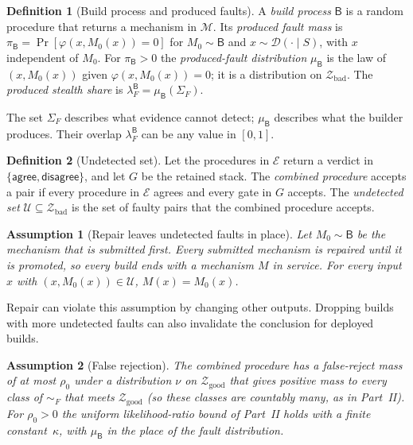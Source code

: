 \documentclass[11pt]{article}
\newtheorem{assumption}{Assumption}
\theoremstyle{definition}
\newtheorem{definition}{Definition}
\theoremstyle{remark}
\newcommand{\simF}{\sim_F}
\newcommand{\SigF}{\Sigma_F}
\newcommand{\D}{\mathcal{D}}
\newcommand{\Zgood}{\mathcal{Z}_{\mathrm{good}}}
\newcommand{\Zbad}{\mathcal{Z}_{\mathrm{bad}}}
\newcommand{\Mclass}{\mathcal{M}}
\newcommand{\Bld}{\mathsf{B}}
\newcommand{\muB}{\mu_{\Bld}}
\newcommand{\piB}{\pi_{\Bld}}
\newcommand{\lFB}{\lambda_F^{\Bld}}
\begin{document}
\begin{definition}[Build process and produced faults]\label{def:build}
A \emph{build process} $\Bld$ is a random procedure that returns a mechanism in $\Mclass$. Its
\emph{produced fault mass} is $\piB=\Pr[\varphi(x,M_0(x))=0]$ for $M_0\sim\Bld$ and
$x\sim\D(\cdot\mid S)$, with $x$ independent of $M_0$. For $\piB>0$ the \emph{produced-fault distribution} $\muB$ is the law of
$(x,M_0(x))$ given $\varphi(x,M_0(x))=0$; it is a distribution on $\Zbad$. The \emph{produced stealth
share} is $\lFB=\muB(\SigF)$.
\end{definition}
The set $\SigF$ describes what evidence cannot detect; $\muB$ describes what the builder produces.
Their overlap $\lFB$ can be any value in $[0,1]$.

\begin{definition}[Undetected set]\label{def:undetected}
Let the procedures in $\mathcal{E}$ return a verdict in $\{\textsf{agree},\textsf{disagree}\}$, and
let $G$ be the retained stack. The \emph{combined procedure} accepts a pair if every procedure in
$\mathcal{E}$ agrees and every gate in $G$ accepts. The \emph{undetected set}
$\mathcal{U}\subseteq\Zbad$ is the set of faulty pairs that the combined procedure accepts.
\end{definition}

\begin{assumption}[Repair leaves undetected faults in place]\label{ass:repair}
Let $M_0\sim\Bld$ be the mechanism that is submitted first. Every submitted mechanism is repaired
until it is promoted, so every build ends with a mechanism $M$ in service. For every input $x$ with
$(x,M_0(x))\in\mathcal{U}$, $M(x)=M_0(x)$.
\end{assumption}
Repair can violate this assumption by changing other outputs.
Dropping builds with more undetected faults can also invalidate the conclusion for deployed builds.

\begin{assumption}[False rejection]\label{ass:fr}
The combined procedure has a false-reject mass of at most $\rho_0$ under a distribution $\nu$ on
$\Zgood$ that gives positive mass to every class of $\simF$ that meets $\Zgood$ (so these classes are
countably many, as in Part~II). For $\rho_0>0$ the uniform likelihood-ratio bound of Part~II holds
with a finite constant~$\kappa$, with $\muB$ in the place of the fault distribution.
\end{assumption}
\end{document}
